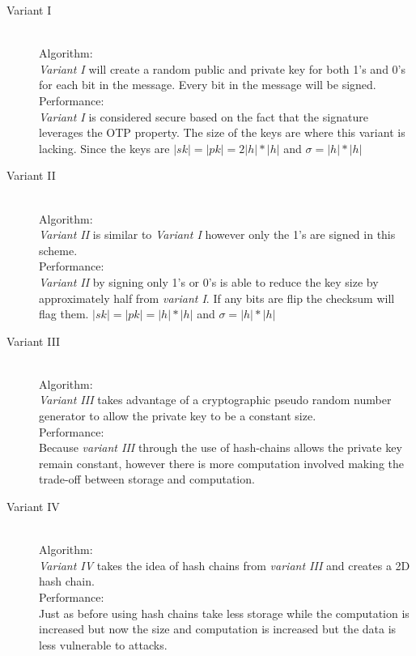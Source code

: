\documentclass[letterpaper,11pt,notitlepage,fleqn]{article}
\begin{document}
\begin{description}
    \item [Variant I] \hfill \\ 
        Algorithm:\hfill \\ 
        \textit{Variant I} will create a random public and private key for both 1's and 0's for each bit in the message. Every bit in the message will be signed. \hfill \\
        Performance:\hfill \\ 
        \textit{Variant I} is considered secure based on the fact that the signature leverages the OTP property. The size of the keys are where this variant is lacking. Since the keys are $|sk|=|pk|=2|h|\ast|h|$ and $\sigma = |h|\ast|h|$ 
    \item [Variant II] \hfill \\
        Algorithm:\\
        \textit{Variant II} is similar to \textit{Variant I} however only the 1's are signed in this scheme.\\
        Performance: \\
        \textit{Variant II} by signing only 1's or 0's is able to reduce the key size by approximately half from \textit{variant I}. If any bits are flip the checksum will flag them. $|sk|=|pk|=|h|\ast|h|$ and $\sigma = |h|\ast|h|$
    \item [Variant III] \hfill \\
        Algorithm:\\
        \textit{Variant III} takes advantage of a cryptographic pseudo random number generator to allow the private key to be a constant size. \\
        Performance:\\
        Because \textit{variant III} through the use of hash-chains allows the private key remain constant, however there is more computation involved making the trade-off between storage and computation. \\
    \item[Variant IV] \hfill \\
        Algorithm:\\
        \textit{Variant IV} takes the idea of hash chains from \textit{variant III} and creates a 2D hash chain.  \\
        Performance:\\
Just as before using hash chains take less storage while the computation is increased but now the size and computation is increased but the data is less vulnerable to attacks. \\


\end{description}
\end{document}
